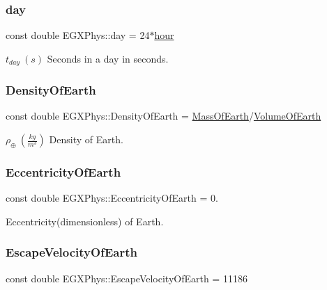 \subsubsection{\texorpdfstring{day}{day}}
{\footnotesize\ttfamily const double E\+G\+X\+Phys\+::day = 24$\ast$\hyperlink{namespace_e_g_x_phys_a85c64ea70cddbb7e4c96adcc01cef6e2}{hour}}

$t_{day}\ (s)$ Seconds in a day in seconds. \mbox{\label{namespace_e_g_x_phys_a2a671e37351b9b7e334385a26a7f7102}} 
\subsubsection{\texorpdfstring{Density\+Of\+Earth}{DensityOfEarth}}
{\footnotesize\ttfamily const double E\+G\+X\+Phys\+::\+Density\+Of\+Earth = \hyperlink{namespace_e_g_x_phys_ace4a9d8c0b21215536857f4c1087a4e8}{Mass\+Of\+Earth}/\hyperlink{namespace_e_g_x_phys_a73aaaddeacf5d59643ec5e4a53a1a251}{Volume\+Of\+Earth}}

$\rho_\oplus\ (\frac{kg}{m^3})$ Density of Earth. \mbox{\label{namespace_e_g_x_phys_a327bbaf59d546f8524d6fb9da919d939}} 
\subsubsection{\texorpdfstring{Eccentricity\+Of\+Earth}{EccentricityOfEarth}}
{\footnotesize\ttfamily const double E\+G\+X\+Phys\+::\+Eccentricity\+Of\+Earth = 0.}

Eccentricity(dimensionless) of Earth. \mbox{\label{namespace_e_g_x_phys_a6a8cb7abae15a2f1bbcfd6623f72316c}} 
\subsubsection{\texorpdfstring{Escape\+Velocity\+Of\+Earth}{EscapeVelocityOfEarth}}
{\footnotesize\ttfamily const double E\+G\+X\+Phys\+::\+Escape\+Velocity\+Of\+Earth = 11186}

